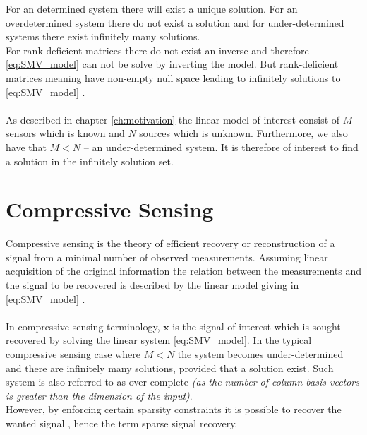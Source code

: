 For an determined system there will exist a unique solution. For an overdetermined system there do not exist a solution and for under-determined systems there exist infinitely many solutions.
\\
For rank-deficient matrices there do not exist an inverse and therefore \eqref{eq:SMV_model} can not be solve by inverting the model. But rank-deficient matrices  meaning have non-empty null space leading to infinitely solutions to \eqref{eq:SMV_model} \cite[p. ix]{CS}.
\\ \\
As described in chapter \ref{ch:motivation} the linear model of interest consist of $M$ sensors which is known and $N$ sources which is unknown. Furthermore, we also have that $M < N$ -- an under-determined system. It is therefore of interest to find a solution in the infinitely solution set.

\section{Compressive Sensing}\label{sec:CS}
Compressive sensing is the theory of efficient recovery or reconstruction of a signal from a minimal number of observed measurements. Assuming linear acquisition of the original information the relation between the measurements and the signal to be recovered is described by the linear model giving in \eqref{eq:SMV_model} \cite{FR}.  
\\ \\
In compressive sensing terminology, $\mathbf{x}$ is the signal of interest which is sought recovered by solving the linear system \eqref{eq:SMV_model}. In the typical compressive sensing case where $M < N$ the system becomes under-determined and there are infinitely many solutions, provided that a solution exist. Such system is also referred to as over-complete \textit{(as the number of column basis vectors is greater than the dimension of the input)}.
\\
However, by enforcing certain sparsity constraints it is possible to recover the wanted signal \cite{FR}, hence the term sparse signal recovery.

